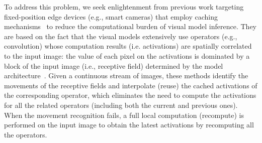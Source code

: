 To address this problem, we seek enlightenment from previous work targeting fixed-position edge devices (e.g., smart cameras) that employ caching mechanisms~\cite{cavigelli_cbinfer_2017,buckler_eva_2018,huynh_deepmon_2017} to reduce the computational burden of visual model inference.
They are based on the fact that the visual models extensively use operators (e.g., convolution) whose computation results (i.e. activations) are spatially correlated to the input image: the value of each pixel on the activations is dominated by a block of the input image (i.e., receptive field) determined by the model architecture~\cite{buckler_eva_2018}.
Given a continuous stream of images, these methods identify the movements of the receptive fields and interpolate (reuse) the cached activations of the corresponding operator, which eliminates the need to compute the activations for all the related operators (including both the current and previous ones). 
When the movement recognition fails, a full local computation (recompute) is performed on the input image to obtain the latest activations by recomputing all the operators.

